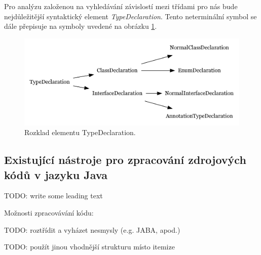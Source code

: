 Pro analýzu založenou na vyhledávání závislostí mezi třídami pro nás bude nejdůležitější syntaktický element \emph{TypeDeclaration}. Tento neterminální symbol se dále přepisuje na symboly uvedené na obrázku \ref{type_declaration_options}.

\begin{figure}[h!]
  \centering
  \includegraphics[width=\textwidth]{./graphs/toplevel_types.png}
  \caption{Rozklad elementu TypeDeclaration.\label{type_declaration_options}}
\end{figure}







\subsection{Existující nástroje pro zpracování zdrojových kódů v jazyku Java}

TODO: write some leading text

Možnosti zpracovávání kódu:

TODO: roztřídit a vyházet nesmysly (e.g. JABA, apod.)

TODO: použít jinou vhodnější strukturu místo itemize

